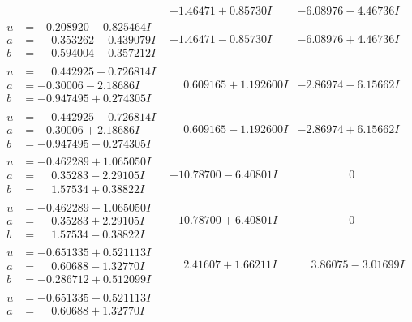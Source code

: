 \documentclass[1p]{elsarticle_modified}
\theoremstyle{definition}
\begin{document}
$$\begin{array}{c|c|c}
 & -1.46471 + 0.85730 I & -6.08976 - 4.46736 I \\ \hline\begin{aligned}
u &= -0.208920 - 0.825464 I \\
a &= \phantom{-}0.353262 - 0.439079 I \\
b &= \phantom{-}0.594004 + 0.357212 I\end{aligned}
 & -1.46471 - 0.85730 I & -6.08976 + 4.46736 I \\ \hline\begin{aligned}
u &= \phantom{-}0.442925 + 0.726814 I \\
a &= -0.30006 - 2.18686 I \\
b &= -0.947495 + 0.274305 I\end{aligned}
 & \phantom{-}0.609165 + 1.192600 I & -2.86974 - 6.15662 I \\ \hline\begin{aligned}
u &= \phantom{-}0.442925 - 0.726814 I \\
a &= -0.30006 + 2.18686 I \\
b &= -0.947495 - 0.274305 I\end{aligned}
 & \phantom{-}0.609165 - 1.192600 I & -2.86974 + 6.15662 I \\ \hline\begin{aligned}
u &= -0.462289 + 1.065050 I \\
a &= \phantom{-}0.35283 - 2.29105 I \\
b &= \phantom{-}1.57534 + 0.38822 I\end{aligned}
 & -10.78700 - 6.40801 I & \phantom{-0.000000 } 0 \\ \hline\begin{aligned}
u &= -0.462289 - 1.065050 I \\
a &= \phantom{-}0.35283 + 2.29105 I \\
b &= \phantom{-}1.57534 - 0.38822 I\end{aligned}
 & -10.78700 + 6.40801 I & \phantom{-0.000000 } 0 \\ \hline\begin{aligned}
u &= -0.651335 + 0.521113 I \\
a &= \phantom{-}0.60688 - 1.32770 I \\
b &= -0.286712 + 0.512099 I\end{aligned}
 & \phantom{-}2.41607 + 1.66211 I & \phantom{-}3.86075 - 3.01699 I \\ \hline\begin{aligned}
u &= -0.651335 - 0.521113 I \\
a &= \phantom{-}0.60688 + 1.32770 I \\

\end{aligned}
\end{array}$$
\end{document}
